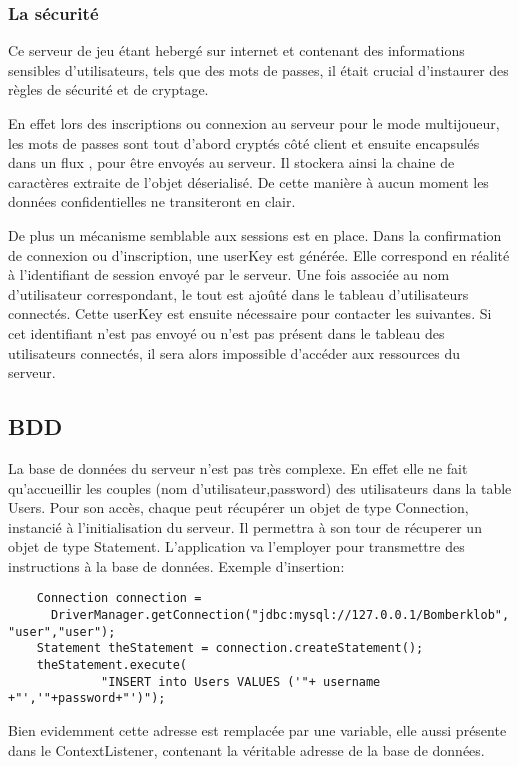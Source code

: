 		
	\subsubsection{La sécurité}
	
		Ce serveur de jeu étant hebergé sur internet et contenant des informations
		sensibles d'utilisateurs, tels que des mots de passes, il était crucial
		d'instaurer des règles de sécurité et de cryptage. 
		
		En effet lors des inscriptions ou connexion au serveur pour le mode
		multijoueur, les mots de passes sont tout d'abord cryptés côté client et
		ensuite encapsulés dans un flux , pour être envoyés au serveur. Il
		stockera ainsi la chaine de caractères extraite de l'objet déserialisé. De cette
		manière à aucun moment les données confidentielles ne transiteront en clair.
		
		De plus un mécanisme semblable aux sessions est en place. Dans la
		confirmation de connexion ou d'inscription, une userKey est générée. Elle correspond en
		réalité à l'identifiant de session envoyé par le serveur. Une fois associée
		au nom d'utilisateur correspondant, le tout est ajoûté dans le tableau
		d'utilisateurs connectés.
		Cette userKey est ensuite nécessaire pour contacter les 
		suivantes. Si cet identifiant n'est pas envoyé ou n'est pas présent dans le tableau des
		utilisateurs connectés, il sera alors impossible d'accéder aux ressources du
		serveur.
		
\subsection{BDD}

	La base de données du serveur n'est pas très complexe. En effet elle ne fait
	qu'accueillir les couples (nom d'utilisateur,password) des utilisateurs dans la
	table Users. 
	Pour son accès, chaque  peut récupérer un objet de type
	Connection, instancié à l'initialisation du serveur. Il permettra à son tour
	de récuperer un objet de type Statement. L'application va l'employer pour
	transmettre des instructions à la base de données.
	Exemple d'insertion: 
		
	\begin{verbatim}
	Connection connection = 
	  DriverManager.getConnection("jdbc:mysql://127.0.0.1/Bomberklob", "user","user");
	Statement theStatement = connection.createStatement();
	theStatement.execute(
		     "INSERT into Users VALUES ('"+ username +"','"+password+"')");
	\end{verbatim}
	
	Bien evidemment cette adresse est remplacée par une variable, elle aussi
	présente dans le ContextListener, contenant la véritable adresse de la base de
	données.
	
	
	
	
